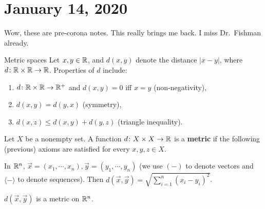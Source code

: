 \section{January 14, 2020}
Wow, these are pre-corona notes. This really brings me back. I miss Dr.\ Fishman already.
\begin{namedthing}{Metric spaces} 
    Let $x,y \in \mathbb{R}$, and $d(x,y)$ denote the distance $|x-y|$, where $d \colon \mathbb{R}\times \mathbb{R} \to \mathbb{R}$. Properties of $d$ include:
    \begin{enumerate}[label=(\arabic*)]
    \setlength\itemsep{-.2em}
\item $d \colon \mathbb{R} \times \mathbb{R}\to \mathbb{R}^+ $ and $d(x,y)=0$ iff $x=y$ (non-negativity),
\item $d(x,y)=d(y,x)$ (symmetry),
\item $d(x,z) \leq d(x,y) + d(y,z)$ (triangle inequality).
    \end{enumerate}
\end{namedthing}
\begin{definition}[]
    Let $X$ be a nonempty set. A function $d \colon X \times X \to \mathbb{R}$ is a \textbf{metric} if the following (previous) axioms are satisfied for every $x,y,z \in X$.
\end{definition}
In $\mathbb{R}^n $, $\vec{x}=(x_1,\cdots ,x_n ),\vec{y} =(y_1,\cdots ,y_n ) $ (we use $(-)$ to denote vectors and $\langle - \rangle $ to denote sequences). Then $d(\vec{x} ,\vec{y} )= \sqrt{ \sum_{i=1}^{n} (x_i -y_i )^2} $.
\begin{theorem}
    $d(\vec x, \vec y)$ is a metric on $\mathbb{R}^n $.
\end{theorem}

